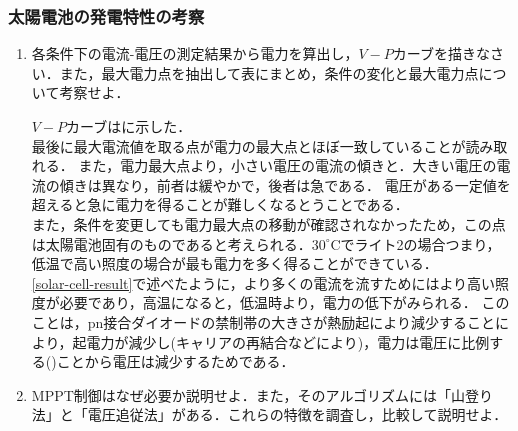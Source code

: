 \clearpage
\subsubsection{太陽電池の発電特性の考察}
\begin{enumerate}[(1)]
	\item 各条件下の電流-電圧の測定結果から電力を算出し，$V-P$カーブを描きなさい．また，最大電力点を抽出して表にまとめ，条件の変化と最大電力点について考察せよ．
	
	$V-P$カーブはに示した．\\
	最後に最大電流値を取る点が電力の最大点とほぼ一致していることが読み取れる．
	また，電力最大点より，小さい電圧の電流の傾きと．大きい電圧の電流の傾きは異なり，前者は緩やかで，後者は急である．
	電圧がある一定値を超えると急に電力を得ることが難しくなるとうことである．\\
	また，条件を変更しても電力最大点の移動が確認されなかったため，この点は太陽電池固有のものであると考えられる．$30^{\circ}$Cでライト2の場合つまり，低温で高い照度の場合が最も電力を多く得ることができている．\\
	\ref{solar-cell-result}で述べたように，より多くの電流を流すためにはより高い照度が必要であり，高温になると，低温時より，電力の低下がみられる．
	このことは，pn接合ダイオードの禁制帯の大きさが熱励起により減少することにより，起電力が減少し(キャリアの再結合などにより)，電力は電圧に比例する()ことから電圧は減少するためである\cite{gvkjen}\cite{vmsd}．
	\item MPPT制御はなぜ必要か説明せよ．また，そのアルゴリズムには「山登り法」と「電圧追従法」がある．これらの特徴を調査し，比較して説明せよ．
	

\end{enumerate}

